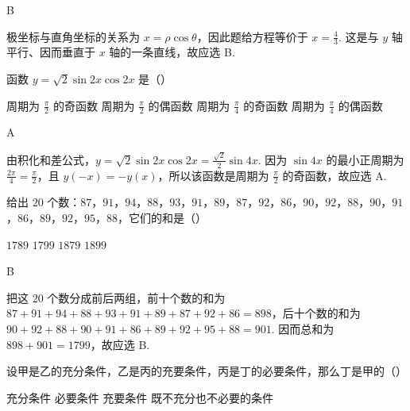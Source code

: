 \begin{answer}
B
\end{answer}

\begin{solution}
极坐标与直角坐标的关系为 \(x=\rho\cos\theta\)，因此题给方程等价于 \(x=\frac{4}{3}\). 这是与 \(y\) 轴平行、因而垂直于 \(x\) 轴的一条直线，故应选 B.
\end{solution}

\begin{problem}

函数 \(y = \sqrt{2}\sin 2x \cos 2x\) 是（\quad）

\choices
    {周期为 \(\frac{\pi}{2}\) 的奇函数}
    {周期为 \(\frac{\pi}{2}\) 的偶函数}
    {周期为 \(\frac{\pi}{4}\) 的奇函数}
    {周期为 \(\frac{\pi}{4}\) 的偶函数}
\end{problem}

\begin{answer}
A
\end{answer}

\begin{solution}
由积化和差公式，\(y=\sqrt{2}\sin 2x\cos 2x=\frac{\sqrt{2}}{2}\sin 4x\). 因为 \(\sin 4x\) 的最小正周期为 \(\frac{2\pi}{4}=\frac{\pi}{2}\)，且 \(y(-x)=-y(x)\)，所以该函数是周期为 \(\frac{\pi}{2}\) 的奇函数，故应选 A.
\end{solution}

\begin{problem}

给出 \(20\) 个数：\(87\)，\(91\)，\(94\)，\(88\)，\(93\)，\(91\)，\(89\)，\(87\)，\(92\)，\(86\)，\(90\)，\(92\)，\(88\)，\(90\)，\(91\)，\(86\)，\(89\)，\(92\)，\(95\)，\(88\)，它们的和是（\quad）

\choices
    {\(1789\)}
    {\(1799\)}
    {\(1879\)}
    {\(1899\)}
\end{problem}

\begin{answer}
B
\end{answer}

\begin{solution}
把这 \(20\) 个数分成前后两组，前十个数的和为 \(87+91+94+88+93+91+89+87+92+86=898\)，后十个数的和为 \(90+92+88+90+91+86+89+92+95+88=901\). 因而总和为 \(898+901=1799\)，故应选 B.
\end{solution}

\begin{problem}

设甲是乙的充分条件，乙是丙的充要条件，丙是丁的必要条件，那么丁是甲的（\quad）

\choices
    {充分条件}
    {必要条件}
    {充要条件}
    {既不充分也不必要的条件}
\end{problem}

